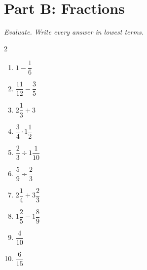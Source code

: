 \documentclass[11pt]{article}
\begin{document}
\section*{Part B: Fractions}
\noindent\textit{Evaluate. Write every answer in lowest terms.}
\begin{multicols}{2}
\begin{enumerate}
  \item $1 - \dfrac{1}{6}$
  \vspace{1.4cm}
  \item $\dfrac{11}{12} - \dfrac{3}{5}$
  \vspace{1.4cm}
  \item $2\dfrac{1}{3} + 3$
  \vspace{1.4cm}
  \item $\dfrac{3}{4} \cdot 1\dfrac{1}{2}$
  \vspace{1.4cm}
  \item $\dfrac{2}{3} \div 1\dfrac{1}{10}$
  \vspace{1.4cm}
  \item $\dfrac{5}{9} \div \dfrac{2}{3}$
  \vspace{1.4cm}
  \item $2\dfrac{1}{4} + 3\dfrac{2}{3}$
  \vspace{1.4cm}
  \item $1\dfrac{2}{5} - 1\dfrac{8}{9}$
  \vspace{1.4cm}
  \item $\dfrac{4}{10}$
  \vspace{1.4cm}
  \item $\dfrac{6}{15}$
  \vspace{1.4cm}
\end{enumerate}
\end{multicols}
\end{document}
